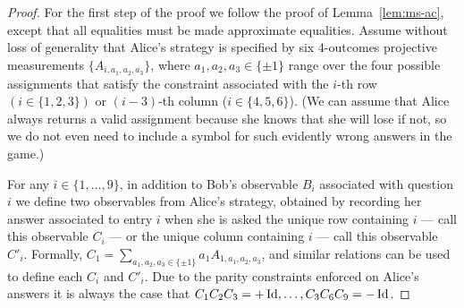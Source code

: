 \begin{proof}
For the first step of the proof we follow the proof of Lemma~\ref{lem:ms-ac}, except that all equalities must be made approximate equalities. 
Assume without loss of generality that Alice's strategy is specified by six $4$-outcomes projective measurements $\{A_{i,a_1,a_2,a_3}\}$, where $a_1,a_2,a_3\in\{\pm 1\}$ range over the four possible assignments that satisfy the constraint associated with the $i$-th row $(i\in \{1,2,3\})$ or $(i-3)$-th column ($i\in \{4,5,6\}$). (We can assume that Alice always returns a valid assignment because she knows that she will lose if not, so we do not even need to include a symbol for such evidently wrong answers in the game.)

For any $i\in\{1,\ldots,9\}$, in addition to Bob's observable $B_i$ associated with question $i$ we define two observables from Alice's strategy, obtained by recording her answer associated to entry $i$ when she is asked the unique row containing $i$ --- call this observable $C_i$ --- or the unique column containing $i$ --- call this observable $C'_i$. Formally, $C_1 = \sum_{a_1,a_2,a_3\in\{\pm 1\}}a_1 A_{1,a_1,a_2,a_3}$, and similar relations can be used to define each $C_i$ and $C'_i$. Due to the parity constraints enforced on Alice's answers it is always the case that $C_1C_2C_3=+\mathop{\rm Id}\nolimits,\ldots,C_3C_6C_9=-\mathop{\rm Id}\nolimits$.
 

\end{proof}
